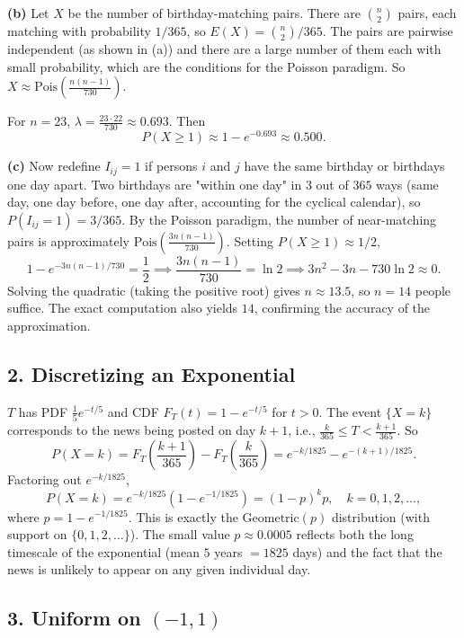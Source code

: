 \documentclass{article}
\begin{document}
\bigskip
\textbf{(b)} Let $X$ be the number of birthday-matching pairs. There are $\binom{n}{2}$ pairs, each matching with probability $1/365$, so $E(X)=\binom{n}{2}/365$. The pairs are pairwise independent (as shown in (a)) and there are a large number of them each with small probability, which are the conditions for the Poisson paradigm. So $X\approx\text{Pois}\!\left(\frac{n(n-1)}{730}\right)$.

For $n=23$, $\lambda=\frac{23\cdot22}{730}\approx0.693$. Then
$$
P(X\ge1)\approx 1-e^{-0.693}\approx 0.500.
$$

\bigskip
\textbf{(c)} Now redefine $I_{ij}=1$ if persons $i$ and $j$ have the same birthday or birthdays one day apart. Two birthdays are "within one day" in $3$ out of $365$ ways (same day, one day before, one day after, accounting for the cyclical calendar), so $P(I_{ij}=1)=3/365$. By the Poisson paradigm, the number of near-matching pairs is approximately $\text{Pois}\!\left(\frac{3n(n-1)}{730}\right)$. Setting $P(X\ge1)\approx1/2$,
$$
1-e^{-3n(n-1)/730}=\frac{1}{2} \implies \frac{3n(n-1)}{730}=\ln2 \implies 3n^2-3n-730\ln2\approx0.
$$
Solving the quadratic (taking the positive root) gives $n\approx13.5$, so $n=14$ people suffice. The exact computation also yields $14$, confirming the accuracy of the approximation.

\subsection*{2. Discretizing an Exponential}

$T$ has PDF $\frac{1}{5}e^{-t/5}$ and CDF $F_T(t)=1-e^{-t/5}$ for $t>0$. The event $\{X=k\}$ corresponds to the news being posted on day $k+1$, i.e., $\frac{k}{365}\le T < \frac{k+1}{365}$. So
$$
P(X=k) = F_T\!\left(\frac{k+1}{365}\right) - F_T\!\left(\frac{k}{365}\right) = e^{-k/1825} - e^{-(k+1)/1825}.
$$
Factoring out $e^{-k/1825}$,
$$
P(X=k) = e^{-k/1825}\!\left(1-e^{-1/1825}\right) = (1-p)^k p, \quad k=0,1,2,\dots,
$$
where $p=1-e^{-1/1825}$. This is exactly the $\text{Geometric}(p)$ distribution (with support on $\{0,1,2,\dots\}$). The small value $p\approx0.0005$ reflects both the long timescale of the exponential (mean $5$ years $= 1825$ days) and the fact that the news is unlikely to appear on any given individual day.

\subsection*{3. Uniform on $(-1,1)$}
\end{document}
